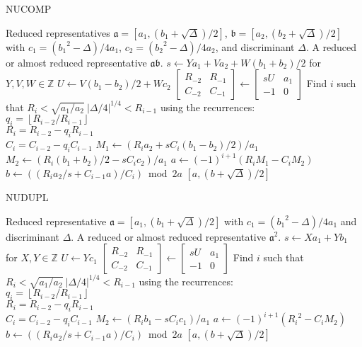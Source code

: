 \documentclass{ucalgthes1}
\theoremstyle{plain}
\theoremstyle{definition}
\newcommand{\ZZ}{\mathbb{Z}}
\newcommand{\matrixtt}[4]{\left[ \begin{array}{rr} #1 & #2 \\ #3 & #4 \end{array} \right]}
\newcommand{\floor}[1]{\left\lfloor #1 \right\rfloor}
\begin{document}
\begin{comment}
\begin{algorithm}[h]
\caption{Is Ambiguous?}
\label{alg:ambiguous}
\begin{algorithmic}[1]
\REQUIRE A reduced representative $\mathfrak a = [a, (b+\sqrt\Delta)/2]$.
\ENSURE True if $\mathfrak a$ is ambiguous, False otherwise.
\IF {$a > 1$}
	\IF {$b = 0$ or $a = b$ or $a = c$}
		\RETURN True.
	\ENDIF
\ENDIF
\RETURN False.
\end{algorithmic}
\end{algorithm}
\end{comment}

\begin{algorithm}[h]
\caption{NUCOMP}
\label{alg:nucomp}
\begin{algorithmic}[1]
\REQUIRE Reduced representatives $\mathfrak a = [a_1, (b_1+\sqrt\Delta)/2]$, $\mathfrak b = [a_2, (b_2+\sqrt\Delta)/2]$ with \break $c_1 = ({b_1}^2-\Delta)/4a_1$, $c_2 = ({b_2}^2-\Delta)/4a_2$, and discriminant $\Delta$.
\ENSURE A reduced or almost reduced representative $\mathfrak a \mathfrak b$.
\STATE $s \gets Ya_1 + Va_2 + W (b_1+b_2)/2$ for $Y, V, W \in \ZZ$
\STATE $U \gets V(b_1-b_2)/2 + Wc_2$
\STATE $\matrixtt{R_{-2}}{R_{-1}}{C_{-2}}{C_{-1}} \gets \matrixtt{sU}{a_1}{-1}{0}$
\STATE Find $i$ such that $R_i < \sqrt{a_1/a_2} ~ |\Delta/4|^{1/4} < R_{i-1}$ using the recurrences: \\
$q_i = \floor{R_{i-2}/R_{i-1}}$ \\
$R_i = R_{i-2}-q_i R_{i-1}$ \\
$C_i=C_{i-2}-q_i C_{i-1}$
\STATE $M_1 \gets (R_i a_2 + sC_i(b_1-b_2)/2)/a_1$
\STATE $M_2 \gets (R_i (b_1+b_2)/2 -sC_i c_2)/a_1$
\STATE $a \gets (-1)^{i+1}(R_i M_1 - C_i M_2)$
\STATE $b \gets ((R_i a_2/s + C_{i-1} a)/C_i) \bmod{2a}$
\RETURN $[a, (b+\sqrt\Delta)/2]$
\end{algorithmic}
\end{algorithm}

\begin{algorithm}[h]
\caption{NUDUPL}
\label{alg:nudupl}
\begin{algorithmic}[1]
\REQUIRE Reduced representative $\mathfrak a = [a_1, (b_1+\sqrt\Delta)/2]$ with $c_1 = ({b_1}^2-\Delta)/4a_1$ and discriminant $\Delta$.
\ENSURE A reduced or almost reduced representative $\mathfrak a^2$.
\STATE $s \gets Xa_1 + Yb_1$ for $X,Y \in \ZZ$
\STATE $U \gets Yc_1$
\STATE $\matrixtt{R_{-2}}{R_{-1}}{C_{-2}}{C_{-1}} \gets \matrixtt{sU}{a_1}{-1}{0}$
\STATE Find $i$ such that $R_i < \sqrt{a_1/a_2} ~ |\Delta/4|^{1/4} < R_{i-1}$ using the recurrences: \\
$q_i = \floor{R_{i-2}/R_{i-1}}$ \\
$R_i = R_{i-2}-q_i R_{i-1}$ \\
$C_i=C_{i-2}-q_i C_{i-1}$
\STATE $M_2 \gets (R_i b_1 -sC_i c_1)/a_1$
\STATE $a \gets (-1)^{i+1}({R_i}^2 - C_i M_2)$
\STATE $b \gets ((R_i a_2/s + C_{i-1} a)/C_i) \bmod{2a}$
\RETURN $[a, (b+\sqrt\Delta)/2]$
\end{algorithmic}
\end{algorithm}
\end{document}
